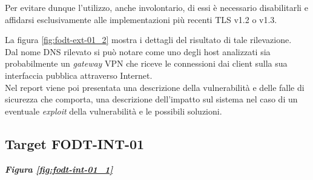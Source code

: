 \documentclass[target=bach,aauheader=]{thud}
\begin{document}
Per evitare dunque l'utilizzo, anche involontario, di essi è necessario disabilitarli e affidarsi esclusivamente alle implementazioni più recenti TLS v1.2 o v1.3.

La figura \ref{fig:fodt-ext-01_2} mostra i dettagli del risultato di tale rilevazione.
\\ Dal nome DNS rilevato si può notare come uno degli host analizzati sia probabilmente un \textit{gateway} VPN che riceve le connessioni dai client sulla sua interfaccia pubblica attraverso Internet. 
\\ Nel report viene poi presentata una descrizione della vulnerabilità e delle falle di sicurezza che comporta, una descrizione dell'impatto sul sistema nel caso di un eventuale \textit{exploit} della vulnerabilità e le possibili soluzioni.

\subsection{Target FODT-INT-01} \textbf{\textit{Figura \ref{fig:fodt-int-01_1}}} \label{fodt-int-01}
\end{document}
